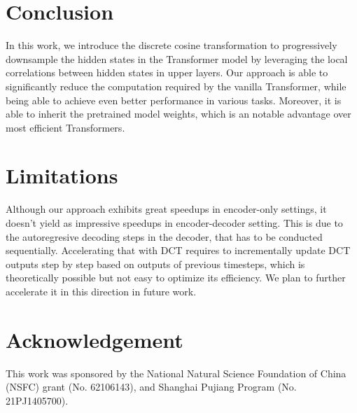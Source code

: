 \documentclass[11pt]{article}
\begin{document}
\section{Conclusion}
In this work, we introduce the discrete cosine transformation to progressively downsample the hidden states in the Transformer model by leveraging the local correlations between hidden states in upper layers. Our approach is able to significantly reduce the computation required by the vanilla Transformer, while being able to achieve even better performance in various tasks. Moreover, it is able to inherit the pretrained model weights, which is an notable advantage over most efficient Transformers.

\section{Limitations}
Although our approach exhibits great speedups in encoder-only settings, it doesn't yield as impressive speedups in encoder-decoder setting. This is due to the autoregresive decoding steps in the decoder, that has to be conducted sequentially. Accelerating that with DCT requires to incrementally update DCT outputs step by step based on outputs of previous timesteps, which is theoretically possible but not easy to optimize its efficiency. We plan to further accelerate it in this direction in future work.

\section*{Acknowledgement}
This work was sponsored by the National Natural Science Foundation of China (NSFC) grant (No.
62106143), and Shanghai Pujiang Program (No. 21PJ1405700). 



\end{document}
